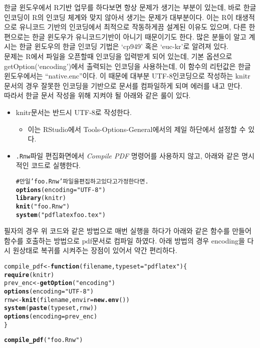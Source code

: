 \documentclass[11pt]{article}\usepackage{graphicx, color}
\makeatletter
\newcommand{\hlfunctioncall}[1]{\textcolor[rgb]{0.501960784313725,0,0.329411764705882}{\textbf{#1}}}%
\newcommand{\hlstring}[1]{\textcolor[rgb]{0.6,0.6,1}{#1}}%
\newcommand{\hlcomment}[1]{\textcolor[rgb]{0.180392156862745,0.6,0.341176470588235}{#1}}%
\newenvironment{kframe}{%
 \def\at@end@of@kframe{}%
 \ifinner\ifhmode%
  \def\at@end@of@kframe{\end{minipage}}%
  \begin{minipage}{\columnwidth}%
 \fi\fi%
 \def\FrameCommand##1{\hskip\@totalleftmargin \hskip-\fboxsep
 \colorbox{shadecolor}{##1}\hskip-\fboxsep
     \hskip-\linewidth \hskip-\@totalleftmargin \hskip\columnwidth}%
 \MakeFramed {\advance\hsize-\width
   \@totalleftmargin\z@ \linewidth\hsize
   \@setminipage}}%
 {\par\unskip\endMakeFramed%
 \at@end@of@kframe}
\newenvironment{knitrout}{}{} %
\makeatother
\begin{document}
한글 윈도우에서 R기반 업무를 하다보면 항상 문제가 생기는 부분이 있는데, 바로 한글 인코딩이 R의 인코딩 체계와 맞지 않아서 생기는 문제가 대부분이다. 이는 R이 태생적으로 유니코드 기반의 인코딩에서 최적으로 작동하게끔 설계된 이유도 있으며, 다른 한편으로는 한글 윈도우가 유니코드기반이 아니기 때문이기도 한다. 많은 분들이 알고 계시는 한글 윈도우의 한글 인코딩 기법은 `cp949' 혹은 `euc-kr'로 알려져 있다.  
\\
문제는 R에서 파일을 오픈할때 인코딩을 입력받게 되어 있는데, 기본 옵션으로 get\-Option\-(`encoding')에서 출력되는 인코딩을 사용하는데, 이 함수의 리턴값은 한글 윈도우에서는 ``native.enc''이다. 이 때문에 대부분 UTF-8인코딩으로 작성하는 knitr문서의 경우 잘못한 인코딩을 기반으로 문서를 컴파일하게 되며 에러를 내고 만다.
\\
따라서 한글 문서 작성을 위해 지켜야 될 아래와 같은 룰이 있다. 
\begin{itemize}
  \item knitr문서는 반드시 UTF-8로 작성한다. 
    \begin{itemize}
      \item 이는 RStudio에서 Tools-Options-General에서의 제일 하단에서 설정할 수 있다.  
    \end{itemize}
  \item \verb|.Rnw|파일 편집화면에서 \textit{Compile PDF} 명령어를 사용하지 않고, 아래와 같은 명시적인 코드로 실행한다.  
\begin{knitrout}
\color{fgcolor}\begin{kframe}
\begin{alltt}
\hlcomment{# 만일 'foo.Rnw'파일을 편집하고 있다고 가정한다면.}
\hlfunctioncall{options}(encoding = \hlstring{"UTF-8"})
\hlfunctioncall{library}(knitr)
\hlfunctioncall{knit}(\hlstring{"foo.Rnw"})
\hlfunctioncall{system}(\hlstring{"pdflatex foo.tex"})
\end{alltt}
\end{kframe}
\end{knitrout}

\end{itemize}
필자의 경우 위 코드와 같은 방법으로 매번 실행을 하다가 아래와 같은 함수를 만들어 함수를 호출하는 방법으로 pdf문서로 컴파일 하였다. 아래 방법의 경우 encoding을 다시 원상태로 복귀를 시켜주는 장점이 있어서 약간 편리하다. 

\begin{knitrout}
\color{fgcolor}\begin{kframe}
\begin{alltt}
compile_pdf <- \hlfunctioncall{function}(filename, typeset = \hlstring{"pdflatex"}) \{
    \hlfunctioncall{require}(knitr)
    prev_enc <- \hlfunctioncall{getOption}(\hlstring{"encoding"})
    \hlfunctioncall{options}(encoding = \hlstring{"UTF-8"})
    rnw <- \hlfunctioncall{knit}(filename, envir = \hlfunctioncall{new.env}())
    \hlfunctioncall{system}(\hlfunctioncall{paste}(typeset, rnw))
    \hlfunctioncall{options}(encoding = prev_enc)
\}

\hlfunctioncall{compile_pdf}(\hlstring{"foo.Rnw"})
\end{alltt}
\end{kframe}
\end{knitrout}
\end{document}
